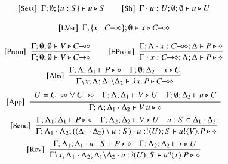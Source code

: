 

\begin{figure}[t!]
\[
	\begin{array}{c}
		\trule{Sess}~~\Gamma; \emptyset; \set{u:S} \proves u \hastype S 
		\qquad
		\trule{Sh}~~\Gamma \cat u : U; \emptyset; \emptyset \proves u \hastype U
		\\[4mm]
		\trule{LVar}~~\Gamma; \set{x: \lhot{C}}; \emptyset \proves x \hastype \lhot{C}
		\\[4mm]

		\trule{Prom}~~\tree{
			\Gamma; \emptyset; \emptyset \proves V \hastype 
                         \lhot{C}
		}{
			\Gamma; \emptyset; \emptyset \proves V \hastype 
                         \shot{C}
		} 
		\qquad
		\trule{EProm}~~\tree{
		\Gamma; \Lambda \cat x : \lhot{C}; \Delta \proves P \hastype \Proc
		}{
			\Gamma \cat x:\shot{C}; \Lambda; \Delta \proves P \hastype \Proc
		}
		\\[4mm]

		\trule{Abs}~~\tree{
			\Gamma; \Lambda; \Delta_1 \proves P \hastype \Proc
			\quad
			\Gamma; \es; \Delta_2 \proves x \hastype C
		}{
			\Gamma\backslash x; \Lambda; \Delta_1 \backslash \Delta_2 \proves \abs{{x}}{P} \hastype \lhot{{C}}
		}
		\\[4mm]

		\trule{App}~~\tree{
			\begin{array}{c}
				U = \lhot{C} \lor \shot{C}
				\quad
				\Gamma; \Lambda; \Delta_1 \proves V \hastype U
				\quad
				\Gamma; \es; \Delta_2 \proves u \hastype C
			\end{array}
		}{
			\Gamma; \Lambda; \Delta_1 \cat \Delta_2 \proves \appl{V}{u} \hastype \Proc
		} 
		\\[4mm]

		\trule{Send}~~\tree{
			\Gamma; \Lambda_1; \Delta_1 \proves P \hastype \Proc
			\quad
			\Gamma; \Lambda_2; \Delta_2 \proves V \hastype U
			\quad
			u:S \in \Delta_1 \cat \Delta_2
		}{
			\Gamma; \Lambda_1 \cat \Lambda_2; ((\Delta_1 \cat \Delta_2) \setminus u:S) \cat u:\btout{U} S \proves \bout{u}{V} P \hastype \Proc
		}
		\\[4mm]

		\trule{Rcv}~~\tree{
			\Gamma; \Lambda_1; \Delta_1 \cat u: S \proves P \hastype \Proc
			\quad
			\Gamma; \Lambda_2; \Delta_2 \proves {x} \hastype {U}
		}{
			\Gamma \backslash x; \Lambda_1\cat \Lambda_2; \Delta_1\backslash \Delta_2 \cat u: \btinp{U} S \vdash \binp{u}{{x}} P \hastype \Proc
		}
		\\[4mm]


\end{array}\]
\end{figure}
